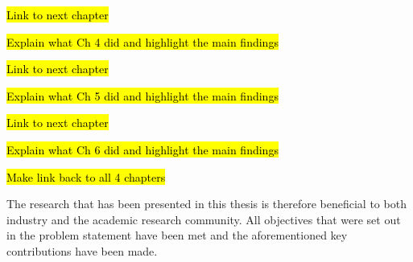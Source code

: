 \hl{Link to next chapter}

\hl{Explain what Ch 4 did and highlight the main findings}

\hl{Link to next chapter}

\hl{Explain what Ch 5 did and highlight the main findings}

\hl{Link to next chapter}

\hl{Explain what Ch 6 did and highlight the main findings}

\hl{Make link back to all 4 chapters}


The research that has been presented in this thesis is therefore beneficial to both industry and the academic research community.
All objectives that were set out in the problem statement have been met and the aforementioned key contributions have been made.


